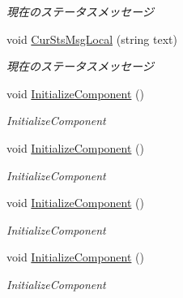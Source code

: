 \begin{DoxyCompactItemize}
\begin{DoxyCompactList}\small\item\em 現在のステータスメッセージ \end{DoxyCompactList}\item 
void \hyperlink{class_reversi4color_wpf_1_1_main_window_a8b1203cb8245c891c935e60a2efead72}{Cur\+Sts\+Msg\+Local} (string text)
\begin{DoxyCompactList}\small\item\em 現在のステータスメッセージ \end{DoxyCompactList}\item 
void \hyperlink{class_reversi4color_wpf_1_1_main_window_a20f84946e71f327820f3ccbefca1f3a0}{Initialize\+Component} ()
\begin{DoxyCompactList}\small\item\em Initialize\+Component \end{DoxyCompactList}\item 
void \hyperlink{class_reversi4color_wpf_1_1_main_window_a20f84946e71f327820f3ccbefca1f3a0}{Initialize\+Component} ()
\begin{DoxyCompactList}\small\item\em Initialize\+Component \end{DoxyCompactList}\item 
void \hyperlink{class_reversi4color_wpf_1_1_main_window_a20f84946e71f327820f3ccbefca1f3a0}{Initialize\+Component} ()
\begin{DoxyCompactList}\small\item\em Initialize\+Component \end{DoxyCompactList}\item 
void \hyperlink{class_reversi4color_wpf_1_1_main_window_a20f84946e71f327820f3ccbefca1f3a0}{Initialize\+Component} ()
\begin{DoxyCompactList}\small\item\em Initialize\+Component \end{DoxyCompactList}\end{DoxyCompactItemize}

